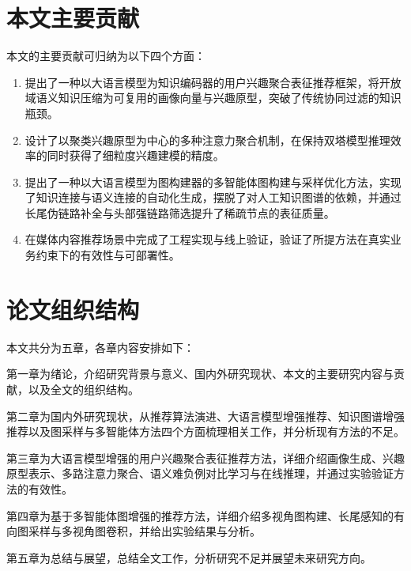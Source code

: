 \section{本文主要贡献}
\label{sec:contribution}

本文的主要贡献可归纳为以下四个方面：

\begin{enumerate}
  \item 提出了一种以大语言模型为知识编码器的用户兴趣聚合表征推荐框架，将开放域语义知识压缩为可复用的画像向量与兴趣原型，突破了传统协同过滤的知识瓶颈。
  \item 设计了以聚类兴趣原型为中心的多种注意力聚合机制，在保持双塔模型推理效率的同时获得了细粒度兴趣建模的精度。
  \item 提出了一种以大语言模型为图构建器的多智能体图构建与采样优化方法，实现了知识连接与语义连接的自动化生成，摆脱了对人工知识图谱的依赖，并通过长尾伪链路补全与头部强链路筛选提升了稀疏节点的表征质量。
  \item 在媒体内容推荐场景中完成了工程实现与线上验证，验证了所提方法在真实业务约束下的有效性与可部署性。
\end{enumerate}

\section{论文组织结构}
\label{sec:arrangement}

本文共分为五章，各章内容安排如下：

第一章为绪论，介绍研究背景与意义、国内外研究现状、本文的主要研究内容与贡献，以及全文的组织结构。

第二章为国内外研究现状，从推荐算法演进、大语言模型增强推荐、知识图谱增强推荐以及图采样与多智能体方法四个方面梳理相关工作，并分析现有方法的不足。

第三章为大语言模型增强的用户兴趣聚合表征推荐方法，详细介绍画像生成、兴趣原型表示、多路注意力聚合、语义难负例对比学习与在线推理，并通过实验验证方法的有效性。

第四章为基于多智能体图增强的推荐方法，详细介绍多视角图构建、长尾感知的有向图采样与多视角图卷积，并给出实验结果与分析。

第五章为总结与展望，总结全文工作，分析研究不足并展望未来研究方向。
